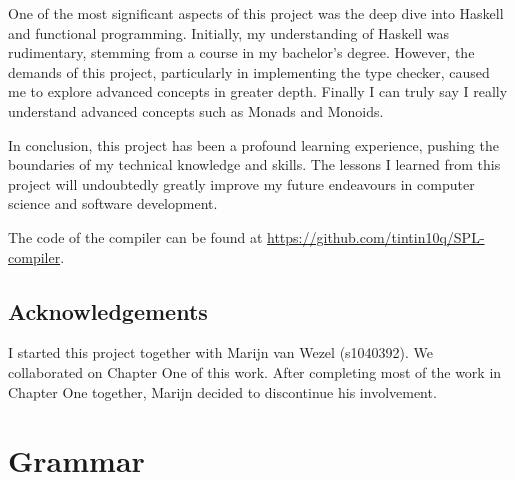 \documentclass{report}
\begin{document}
One of the most significant aspects of this project was the deep dive into Haskell and functional programming. Initially, my understanding of Haskell was rudimentary, stemming from a course in my bachelor's degree. However, the demands of this project, particularly in implementing the type checker, caused me to explore advanced concepts in greater depth. Finally I can truly say I really understand advanced concepts such as Monads and Monoids.

In conclusion, this project has been a profound learning experience, pushing the boundaries of my technical knowledge and skills. The lessons I learned from this project will undoubtedly greatly improve my future endeavours in computer science and software development.

\noindent The code of the compiler can be found at \href{https://github.com/tintin10q/SPL-compiler}{https://github.com/tintin10q/SPL-compiler}.

\section{Acknowledgements}

I started this project together with Marijn van Wezel (s1040392). We collaborated on Chapter One of this work. After completing most of the work in Chapter One together, Marijn decided to discontinue his involvement.




\appendix
\chapter{Grammar}
\end{document}

